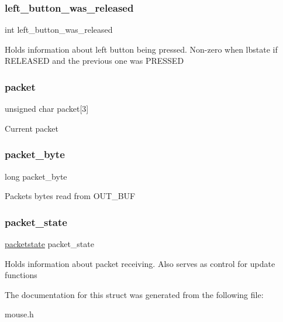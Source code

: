 \subsubsection{\texorpdfstring{left\+\_\+button\+\_\+was\+\_\+released}{left\_button\_was\_released}}
{\footnotesize\ttfamily int left\+\_\+button\+\_\+was\+\_\+released}

Holds information about left button being pressed. Non-\/zero when lbstate if R\+E\+L\+E\+A\+S\+ED and the previous one was P\+R\+E\+S\+S\+ED \hypertarget{struct_mouse_a1d1878244696a8be772aa71772c33f0a}{}\label{struct_mouse_a1d1878244696a8be772aa71772c33f0a} 
\subsubsection{\texorpdfstring{packet}{packet}}
{\footnotesize\ttfamily unsigned char packet\mbox{[}3\mbox{]}}

Current packet \hypertarget{struct_mouse_a005ddb9e0f69d5f8ff8ba9811006637f}{}\label{struct_mouse_a005ddb9e0f69d5f8ff8ba9811006637f} 
\subsubsection{\texorpdfstring{packet\+\_\+byte}{packet\_byte}}
{\footnotesize\ttfamily long packet\+\_\+byte}

Packets\textquotesingle{} bytes read from O\+U\+T\+\_\+\+B\+UF \hypertarget{struct_mouse_a600d48813331aacf281603f33b7ce452}{}\label{struct_mouse_a600d48813331aacf281603f33b7ce452} 
\subsubsection{\texorpdfstring{packet\+\_\+state}{packet\_state}}
{\footnotesize\ttfamily \hyperlink{group__mouse_ga15fce23ec12347df2f9ef8c3366eb01d}{packetstate} packet\+\_\+state}

Holds information about packet receiving. Also serves as control for update functions 

The documentation for this struct was generated from the following file\+:\begin{DoxyCompactItemize}
\item 
mouse.\+h\end{DoxyCompactItemize}
